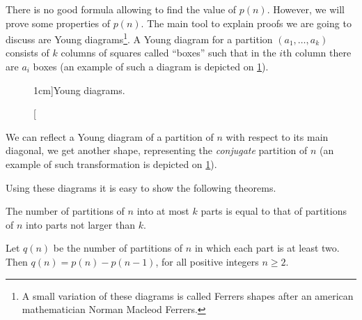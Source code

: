 

There is no good formula allowing to find the value of $p(n)$. However, we will
prove some properties of $p(n)$. The main tool to explain proofs we are going to
discuss are Young diagrams\footnote{%
  A small variation of these diagrams is called Ferrers shapes after an
  american mathematician Norman Macleod Ferrers.
}.
A Young diagram for a partition $(a_1, \dots, a_k)$ consists of $k$ columns of
squares called ``boxes'' such that in the $i$th column there are $a_i$ boxes
(an example of such a diagram is depicted on \ref{figure:young-diagram-example}).
\begin{figure}
  \centering
  \qquad\qquad
  \caption[][1cm]{Young diagrams.}
  \label{figure:young-diagram-example}
\end{figure}
We can reflect a Young diagram of a partition of $n$ with respect to its main
diagonal, we get another shape, representing the \emph{conjugate} partition of
$n$ (an example of such transformation is depicted on
\ref{figure:young-diagram-example}).

Using these diagrams it is easy to show the following theorems.
\begin{theorem}
  The number of partitions of $n$ into at most $k$ parts is equal to that of
  partitions of $n$ into parts not larger than $k$.
\end{theorem}

\begin{theorem}
  Let $q(n)$ be the number of partitions of $n$ in which each part is at least
  two. Then $q(n) = p(n) - p(n - 1)$, for all positive integers $n \ge 2$.
\end{theorem}
